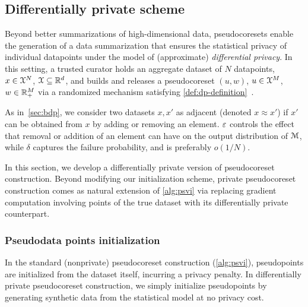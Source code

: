 \subsection{Differentially private scheme}
\label{sec:dp-pseudocoresets}

Beyond better summarizations of high-dimensional data, pseudocoresets enable the 
generation of a data summarization that ensures the statistical privacy of individual datapoints under the model of (approximate) \emph{differential privacy}. In this setting, a trusted
 curator holds an aggregate dataset of $N$ datapoints, $x\in\mathcal{X}^N$, $\mathcal{X}\subseteq \mathbb{R}^d$, and 
builds and releases a pseudocoreset $(u, w)$, $u\in\mathcal{X}^M$, $w\in\mathbb{R}_+^M$ via
a randomized mechanism satisfying \cref{def:dp-definition}~\citep{dwork06, ourdata}.

As in~\cref{sec:bdp}, we consider two datasets $x, x'$ as adjacent (denoted 
$ x \approx x' $) if $ x' $ can be obtained from $ x $ by adding or removing an
element.  $ \varepsilon $ controls the effect that removal or addition of an element
can have on the output distribution of $\mathcal{M}$, while %
$ \delta $
captures the failure probability, 
and is preferably $ o(1/N)$. 

In this section, we develop a differentially private version of pseudocoreset construction.
Beyond modifying our initialization scheme, private pseudocoreset
construction comes as natural extension of \cref{alg:psvi}
 via replacing gradient computation involving points of the
true dataset with its differentially private counterpart. 


\subsubsection{Pseudodata points initialization}
\label{sec:pseudo-points-initilization}

In the standard (nonprivate) pseudocoreset construction (\cref{alg:psvi}), pseudopoints are initialized from the dataset itself,
incurring a privacy penalty. In differentially private pseudocoreset construction,
we simply initialize pseudopoints by generating synthetic data from the statistical model
at no privacy cost.



